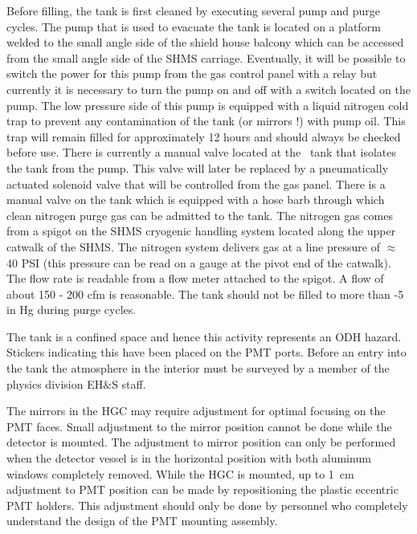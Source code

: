 {Before filling, the tank is first cleaned by executing several pump
and purge cycles. The pump that is used to evacuate the tank is located on a
platform welded to the small angle side of the shield house balcony
which can be accessed from the small angle side of the SHMS carriage.
Eventually, it will be possible to switch the power for this pump
from the gas control panel with a relay but currently it
is necessary to turn the pump on and off with a switch located on the pump.
The low pressure side of this pump is equipped with a liquid nitrogen
cold trap to prevent any contamination of the tank (or mirrors !)
with pump oil. This trap will remain filled for approximately
12 hours and should always be checked before use. There is currently
a manual valve located at the \Cerenkov\ tank that isolates the tank from
the pump.  This valve will later be replaced by a pneumatically actuated
solenoid valve that will be controlled from the gas panel.
There is a manual valve on the tank which is equipped with a hose
barb through which clean nitrogen purge gas can be admitted to the tank.
The nitrogen gas comes from a spigot on the SHMS cryogenic handling system
located along the upper catwalk of the SHMS. The nitrogen system
delivers gas at a line pressure of $\approx$ 40 PSI (this pressure can
be read on a gauge at the pivot end of the catwalk). The flow
rate is readable from a flow meter attached to the spigot. A flow of
about 150 - 200 cfm is reasonable. The tank should not be filled to
more than -5 in Hg during purge cycles.

}



The tank is a confined space and hence this activity represents an ODH
hazard. Stickers indicating this have been placed on the PMT
ports. Before an entry into the tank the atmosphere in the interior
must be surveyed by a member of the physics division EH$\&$S staff.

The mirrors in the HGC may require adjustment for optimal focusing on
the PMT faces. Small adjustment to the mirror position cannot be done
while the detector is mounted. The adjustment to mirror position can
only be performed when the detector vessel is in the horizontal
position with both aluminum windows completely removed. While the HGC
is mounted, up to 1~cm adjustment to PMT position can be made by
repositioning the plastic eccentric PMT holders. This adjustment
should only be done by personnel who completely understand the design
of the PMT mounting assembly.






